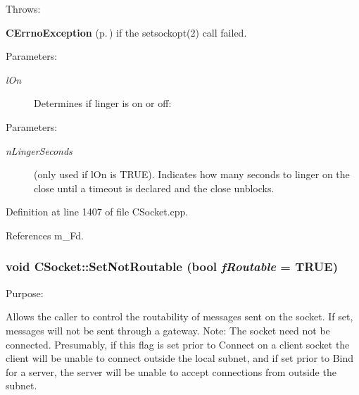 Throws:\begin{CompactItemize}
\item 
{\bf CErrno\-Exception} {\rm (p.\,\pageref{classCErrnoException})} if the setsockopt(2) call failed.\end{CompactItemize}
\begin{Desc}
\item[Parameters: ]\par
\begin{description}
\item[{\em 
l\-On}]Determines if linger is on or off:
\end{description}
\end{Desc}
\begin{Desc}
\item[Parameters: ]\par
\begin{description}
\item[{\em 
n\-Linger\-Seconds}](only used if l\-On is TRUE). Indicates how many seconds to linger on the close until a timeout is declared and the close unblocks. \end{description}
\end{Desc}


Definition at line 1407 of file CSocket.cpp.

References m\_\-Fd.
\subsubsection{\setlength{\rightskip}{0pt plus 5cm}void CSocket::Set\-Not\-Routable (bool {\em f\-Routable} = TRUE)}\label{classCSocket_a26}


Purpose:

Allows the caller to control the routability of messages sent on the socket. If set, messages will not be sent through a gateway. Note: The socket need not be connected. Presumably, if this flag is set prior to Connect on a client socket the client will be unable to connect outside the local subnet, and if set prior to Bind for a server, the server will be unable to accept connections from outside the subnet.

